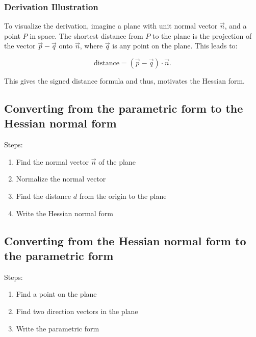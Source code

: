 \subsubsection{Derivation Illustration}

To visualize the derivation, imagine a plane with unit normal vector \(\vec{n}\), and a point \(P\) in space. The shortest distance from \(P\) to the plane is the projection of the vector \(\vec{p} - \vec{q}\) onto \(\vec{n}\), where \(\vec{q}\) is any point on the plane. This leads to:

\[
	\text{distance} = (\vec{p} - \vec{q}) \cdot \vec{n}.
\]

This gives the signed distance formula and thus, motivates the Hessian form.

\subsection{Converting from the parametric form to the Hessian normal form}

Steps:

\begin{enumerate}

	\item Find the normal vector \(\vec{n}\) of the plane
	
	\item Normalize the normal vector
	
	\item Find the distance \(d\) from the origin to the plane
	
	\item Write the Hessian normal form

\end{enumerate}

\subsection{Converting from the Hessian normal form to the parametric form}

Steps:

\begin{enumerate}

	\item Find a point on the plane

	\item Find two direction vectors in the plane

	\item Write the parametric form

\end{enumerate}

